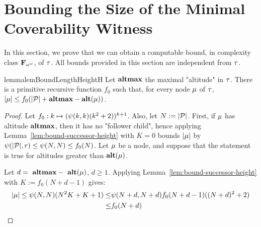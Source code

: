 \section{Bounding the Size of the Minimal Coverability Witness}
\label{app:proofs_bounds}

In this section, we prove that we can obtain a computable bound, in complexity class $\mathbf{F}_{\omega^{\omega}}$, of $\tau$. All bounds provided in this section are independent from $\tau$. 

\begin{restatable}{lemma}{lemBoundLengthHeightH}
	\label{lem:bound-length-at-height-h}
	Let $\mathbf{altmax}$ the maximal "altitude" in $\tau$. There is a primitive recursive function $f_0$ such that, for every node $\mu$ of $\tau$, $|\mu| \leq f_0(|\mathcal{P}| + \mathbf{altmax} - \mathbf{alt}(\mu))$.
\end{restatable}
\begin{proof}
Let $f_0: k \mapsto (\psi(k,k) (k^2 +2))^{k+1}$. Also, let $N := |\mathcal{P}|$.
First, if $\mu$ has altitude $\mathbf{altmax}$, then it has no "follower child", hence applying Lemma~\ref{lem:bound-successor-height} with $K=0$ bounds $|\mu|$ by $\psi(|\mathcal{P}|,r) \leq \psi(N,N) \leq f_0(N)$. Let $\mu$ be a node, and suppose that the statement is true for altitudes greater than $\mathbf{alt}(\mu)$. ~

Let $d =~\mathbf{altmax} - ~\mathbf{alt}(\mu)$, $d\geq 1$. Applying Lemma~\ref{lem:bound-successor-height} with $K := f_0(N + d - 1)$ gives: 
\begin{align*}
|\mu| \leq \psi(N,N) (N^2 K + K + 1) \leq & \psi(N+d,N+d) f_0(N+d-1) ((N+d)^2 +2)   \\ \leq & f_0(N+d) 
\end{align*}
\end{proof}

	
		
